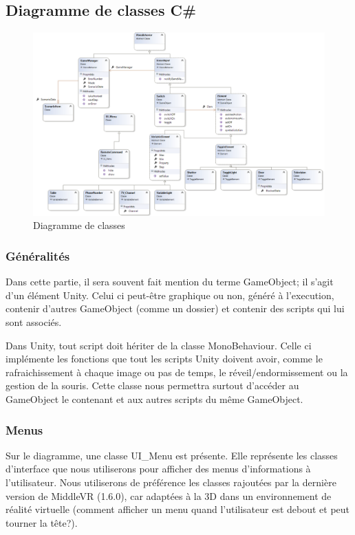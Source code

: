 \subsection{Diagramme de classes C\#}

\begin{landscape}
  \begin{figure}
    \centering
    \includegraphics[width=0.9\linewidth]{4-Conception/img/diagClasses.png}
    \caption{Diagramme de classes}
    \label{fig:class_diagram}
  \end{figure}
\end{landscape}

\subsubsection{Généralités}
Dans cette partie, il sera souvent fait mention du terme GameObject; il s'agit d'un élément Unity. 
Celui ci peut-être graphique ou non, généré à l'execution, contenir d'autres GameObject (comme un dossier) et contenir des scripts qui lui sont associés.

Dans Unity, tout script doit hériter de la classe MonoBehaviour.
Celle ci implémente les fonctions que tout les scripts Unity doivent avoir, comme le rafraichissement à chaque image ou pas de temps, le réveil/endormissement ou la gestion de la souris.
Cette classe nous permettra surtout d'accéder au GameObject le contenant et aux autres scripts du même GameObject.

\subsubsection{Menus}
Sur le diagramme, une classe UI\_Menu est présente. Elle représente les classes d'interface que nous utiliserons pour afficher des menus d'informations à l'utilisateur.
Nous utiliserons de préférence les classes rajoutées par la dernière version de MiddleVR (1.6.0), car adaptées à la 3D dans un environnement de réalité virtuelle (comment afficher un menu quand l'utilisateur est debout et peut tourner la tête?).

